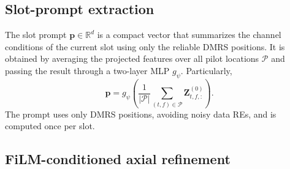 \documentclass[conference,letterpaper]{IEEEtran}
\begin{document}
	\subsection{Slot-prompt extraction}
	\label{subsec:prompt}
	
	The slot prompt $\mathbf{p}\in\mathbb{R}^{d}$ is a compact vector that summarizes the channel conditions of the current slot using only the reliable DMRS positions.
	It is obtained by averaging the projected features over all pilot locations $\mathcal{P}$ and passing the result through a two-layer MLP $g_\psi$. Particularly,
	\begin{equation}
		\label{eq:prompt_pool}
		\mathbf{p}
		=
		g_{\psi}\!\left(
		\frac{1}{|\mathcal{P}|}
		\sum_{(t,f)\in\mathcal{P}} \mathbf{Z}^{(0)}_{t,f,:}
		\right).
	\end{equation}
	The prompt uses only DMRS positions, avoiding noisy data REs, and is computed once per slot.
	\vspace{-.2cm}
	\subsection{FiLM-conditioned axial refinement}
	\label{subsec:axial_refinement}
	
\end{document}
